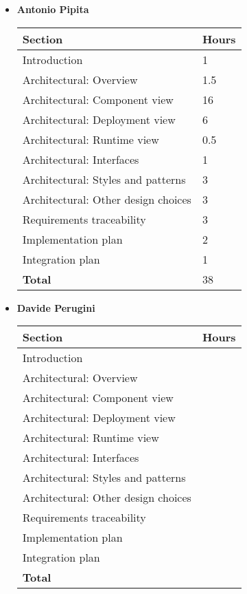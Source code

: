 \begin{itemize}
\item \textbf{Antonio Pipita}

\begin{table}[!h]
\centering
\begin{tabular}{|l|l|}
\hline
\textbf{Section}														&		\textbf{Hours}  \\ \hline
Introduction														&  	1	\\ \hline
Architectural: Overview						& 		1.5 	\\ \hline
Architectural: Component view						& 		16 	\\ \hline
Architectural: Deployment view						& 		6 	\\ \hline
Architectural: Runtime view						& 	0.5	 	\\ \hline
Architectural: Interfaces						& 	1	 	\\ \hline
Architectural: Styles and patterns					& 	3	 	\\ \hline
Architectural: Other design choices					& 	3	 	\\ \hline
Requirements traceability					& 	3	 	\\ \hline
Implementation plan					& 		2 	\\ \hline
Integration plan					& 		1	\\ \hline
\textbf{Total}															& 38 	\\ \hline
\end{tabular}
\end{table}

\item \textbf{Davide Perugini}

\begin{table}[!h]
	\centering
	\begin{tabular}{|l|l|}
		\hline
		\textbf{Section}														&		\textbf{Hours}  \\ \hline
		Introduction														&  		\\ \hline
		Architectural: Overview						& 		 	\\ \hline
		Architectural: Component view						& 		 	\\ \hline
		Architectural: Deployment view						& 		 	\\ \hline
		Architectural: Runtime view						& 		 	\\ \hline
		Architectural: Interfaces						& 		 	\\ \hline
		Architectural: Styles and patterns					& 		 	\\ \hline
		Architectural: Other design choices					& 		 	\\ \hline
		Requirements traceability					& 		 	\\ \hline
		Implementation plan					& 		 	\\ \hline
		Integration plan					& 		 	\\ \hline
		\textbf{Total}															&  	\\ \hline
	\end{tabular}
\end{table}


\end{itemize}
